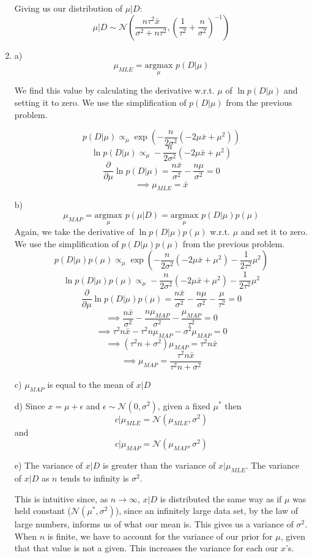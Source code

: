 \documentclass[submit]{harvardml}
\begin{document}
\begin{enumerate}
Giving us our distribution of $\mu|D$:
$$\mu|D\sim\mathcal{N}\left(\frac{n\tau^2\bar{x}}{\sigma^2+n\tau^2}, \left(\frac{1}{\tau^2}+\frac{n}{\sigma^2}\right)^{-1}\right)$$

\item

a) $$\mu_{MLE} = \underset{\mu}{\mathrm{argmax}} \,\,p(D|\mu)$$

We find this value by calculating the derivative w.r.t. $\mu$ of $\ln p(D|\mu)$ and setting it to zero. 
We use the simplification of $p(D|\mu)$ from the previous problem.

$$p(D|\mu) \propto_\mu \exp\left(-\frac{n}{2\sigma^2} \left( - 2\mu \bar{x} + \mu^2\right)\right) $$
$$\ln p(D|\mu) \propto_\mu -\frac{n}{2\sigma^2} \left( - 2\mu \bar{x} + \mu^2\right) $$
$$\frac{\partial}{\partial\mu} \ln p(D|\mu) = \frac{n\bar{x}}{\sigma^2} - \frac{n\mu}{\sigma^2} = 0  $$
$$\implies\mu_{MLE} = \bar{x} $$

b) $$\mu_{MAP} = \underset{\mu}{\mathrm{argmax}} \,\,p(\mu|D) = \underset{\mu}{\mathrm{argmax}} \,\,p(D|\mu)p(\mu)$$
Again, we take the derivative of $\ln p(D|\mu)p(\mu)$ w.r.t. $\mu$ and set it to zero. We use the simplification of $p(D|\mu)p(\mu)$ from the 
previous problem.
$$p(D|\mu)p(\mu) \propto_\mu \exp\left(-\frac{n}{2\sigma^2} \left( - 2\mu \bar{x} + \mu^2\right) - \frac{1}{2\tau^2}  \mu^2\right)$$
$$\ln p(D|\mu)p(\mu) \propto_\mu -\frac{n}{2\sigma^2} \left( - 2\mu \bar{x} + \mu^2\right) - \frac{1}{2\tau^2}  \mu^2$$
$$\frac{\partial}{\partial \mu} \ln p(D|\mu)p(\mu) = \frac{n\bar{x}}{\sigma^2} - \frac{n\mu}{\sigma^2} - \frac{\mu}{\tau^2} = 0$$
$$\implies \frac{n\bar{x}}{\sigma^2} - \frac{n\mu_{MAP}}{\sigma^2} - \frac{\mu_{MAP}}{\tau^2} = 0$$
$$\implies \tau^2n\bar{x} - \tau^2n\mu_{MAP} - \sigma^2\mu_{MAP} = 0$$
$$\implies (\tau^2n + \sigma^2)\mu_{MAP} = \tau^2n\bar{x}$$
$$\implies \mu_{MAP} = \frac{\tau^2n\bar{x}}{\tau^2n + \sigma^2}$$

c) $\mu_{MAP}$ is equal to the mean of $x|D$

d) Since $x = \mu + \epsilon $ and $\epsilon \sim \mathcal{N}(0, \sigma^2)$, given a 
fixed $\mu^*$ then 
$$c|\mu_{MLE} = \mathcal{N}(\mu_{MLE}, \sigma^2)$$ and 
$$c|\mu_{MAP} = \mathcal{N}(\mu_{MAP}, \sigma^2)$$


e) The variance of $x|D$ is greater than the variance of $x|\mu_{MLE}$. The variance of $x|D$ as 
$n$ tends to infinity is $\sigma^2$.

This is intuitive since, as $n\to\infty$, $x|D$ is distributed the same way as 
if $\mu$ was held constant ($\mathcal{N}(\mu^*, \sigma^2)$), since an infinitely large
data set, by the law of large numbers, informs us of what our mean is. This gives us a variance
of $\sigma^2$. When $n$ is finite, we have to account for the variance of our prior
for $\mu$, given that that value is not a given. This increases the variance for each our $x$'s.


\end{enumerate}
\end{document}
